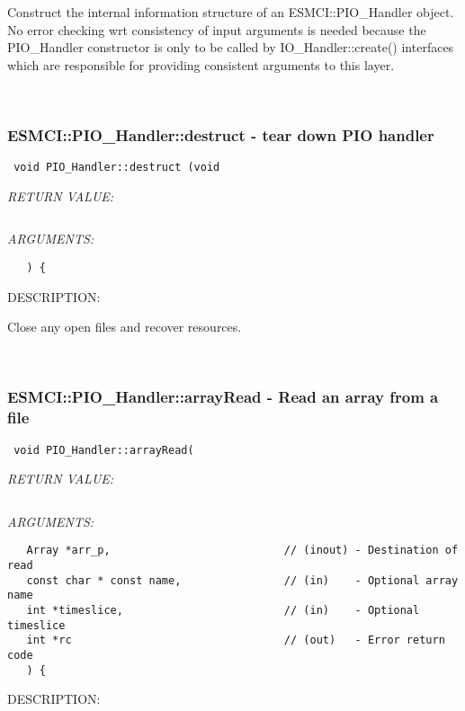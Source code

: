       Construct the internal information structure of an ESMCI::PIO_Handler
      object.
      No error checking wrt consistency of input arguments is needed because
      the PIO_Handler constructor is only to be called by IO_Handler::create()
      interfaces which are responsible for providing consistent arguments
      to this layer.
   
 
\mbox{}\hrulefill\
 
\subsubsection [ESMCI::PIO\_Handler::destruct] {ESMCI::PIO\_Handler::destruct - tear down PIO handler}


  
\begin{verbatim} void PIO_Handler::destruct (void\end{verbatim}{\em RETURN VALUE:}
\begin{verbatim}      \end{verbatim}{\em ARGUMENTS:}
\begin{verbatim}   ) {\end{verbatim}
{\sf DESCRIPTION:\\ }


      Close any open files and recover resources.
   
 
\mbox{}\hrulefill\
 
\subsubsection [ESMCI::PIO\_Handler::arrayRead] {ESMCI::PIO\_Handler::arrayRead - Read an array from a file}


  
\begin{verbatim} void PIO_Handler::arrayRead(\end{verbatim}{\em RETURN VALUE:}
\begin{verbatim}      \end{verbatim}{\em ARGUMENTS:}
\begin{verbatim}   Array *arr_p,                           // (inout) - Destination of read
   const char * const name,                // (in)    - Optional array name
   int *timeslice,                         // (in)    - Optional timeslice
   int *rc                                 // (out)   - Error return code
   ) {\end{verbatim}
{\sf DESCRIPTION:\\ }


